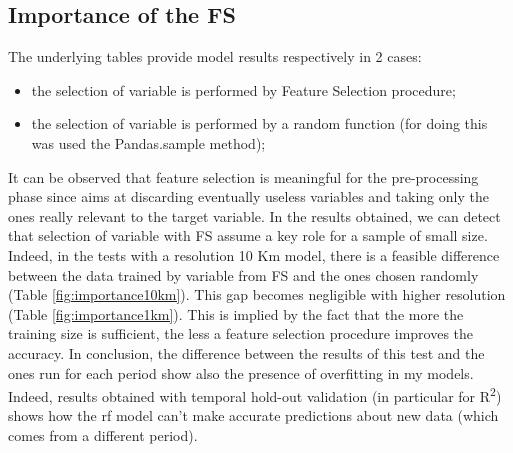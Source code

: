 \subsection{Importance of the FS}
The underlying tables provide model results respectively in 2 cases:
\begin{itemize}
    \item the selection of variable is performed by Feature Selection procedure;
    \item the selection of variable is performed by a random function (for doing this was used the Pandas.sample method);
\end{itemize}
It can be observed that feature selection is meaningful for the pre-processing phase since aims at discarding eventually useless variables and taking only the ones really relevant to the target variable. In the results obtained, we can detect that selection of variable with FS assume a key role for a sample of small size. 
Indeed, in the tests with a resolution 10 Km model, there is a feasible difference between the data trained by variable from FS and the ones chosen randomly (Table \ref{fig:importance10km}). 
This gap becomes negligible with higher resolution (Table \ref{fig:importance1km}).
This is implied by the fact that the more the training size is sufficient, the less a feature selection procedure improves the accuracy\cite{chu2012does}.
\newline
In conclusion, the difference between the results of this test and the ones run for each period show also the presence of overfitting in my models. Indeed, results obtained with temporal hold-out validation (in particular for  R\textsuperscript{2}) shows how the \acrshort{rf} model can't make accurate predictions about new data (which comes from a different period).  

\begin{table}[H]
\centering
{}
\\
\caption{Random Forest prediction for PM2.5, including zones with mountains using or not FS.}
\end{table}